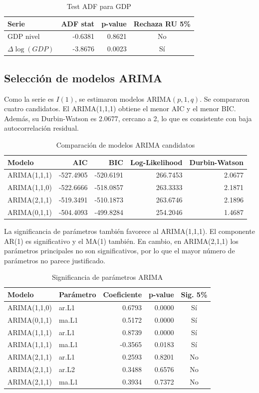 \documentclass[11pt,letterpaper]{article}
\begin{document}
\begin{table}[H]
\centering
\caption{Test ADF para GDP}
\begin{tabular}{lrrc}
\toprule
Serie & ADF stat & p-value & Rechaza RU 5\% \\
\midrule
GDP nivel & -0.6381 & 0.8621 & No \\
$\Delta\log(GDP)$ & -3.8676 & 0.0023 & Sí \\
\bottomrule
\end{tabular}
\end{table}

\subsection{Selección de modelos ARIMA}

Como la serie es $I(1)$, se estimaron modelos ARIMA$(p,1,q)$. Se compararon cuatro candidatos. El ARIMA(1,1,1) obtiene el menor AIC y el menor BIC. Además, su Durbin-Watson es 2.0677, cercano a 2, lo que es consistente con baja autocorrelación residual.

\begin{table}[H]
\centering
\caption{Comparación de modelos ARIMA candidatos}
\begin{tabular}{lrrrr}
\toprule
Modelo & AIC & BIC & Log-Likelihood & Durbin-Watson \\
\midrule
ARIMA(1,1,1) & -527.4905 & -520.6191 & 266.7453 & 2.0677 \\
ARIMA(1,1,0) & -522.6666 & -518.0857 & 263.3333 & 2.1871 \\
ARIMA(2,1,1) & -519.3491 & -510.1873 & 263.6746 & 2.1896 \\
ARIMA(0,1,1) & -504.4093 & -499.8284 & 254.2046 & 1.4687 \\
\bottomrule
\end{tabular}
\end{table}

La significancia de parámetros también favorece al ARIMA(1,1,1). El componente AR(1) es significativo y el MA(1) también. En cambio, en ARIMA(2,1,1) los parámetros principales no son significativos, por lo que el mayor número de parámetros no parece justificado.

\begin{table}[H]
\centering
\caption{Significancia de parámetros ARIMA}
\begin{tabular}{llrrc}
\toprule
Modelo & Parámetro & Coeficiente & p-value & Sig. 5\% \\
\midrule
ARIMA(1,1,0) & ar.L1 & 0.6793 & 0.0000 & Sí \\
ARIMA(0,1,1) & ma.L1 & 0.5172 & 0.0000 & Sí \\
ARIMA(1,1,1) & ar.L1 & 0.8739 & 0.0000 & Sí \\
ARIMA(1,1,1) & ma.L1 & -0.3565 & 0.0183 & Sí \\
ARIMA(2,1,1) & ar.L1 & 0.2593 & 0.8201 & No \\
ARIMA(2,1,1) & ar.L2 & 0.3488 & 0.6576 & No \\
ARIMA(2,1,1) & ma.L1 & 0.3934 & 0.7372 & No \\
\bottomrule
\end{tabular}
\end{table}
\end{document}
